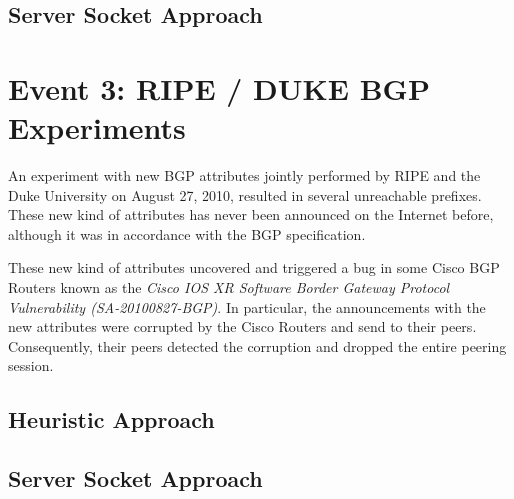 \subsection{Server Socket Approach}

\newpage
\section{Event 3: RIPE / DUKE BGP Experiments}

An experiment with new BGP attributes jointly performed by RIPE and the Duke 
University on August 27, 2010, resulted in several unreachable prefixes\citep{SchatzmannPAM2011}. These 
new kind of attributes has never been announced on the Internet before,  
although it was in accordance with the BGP specification\citep{ripe_duke}.

These new kind of attributes uncovered and triggered a bug in some Cisco BGP 
Routers known as the \emph{Cisco IOS XR Software Border Gateway Protocol Vulnerability (SA-20100827-BGP)}\citep{cisco_vulnerability}. In particular, the announcements with the new attributes were corrupted 
by the Cisco Routers and send to their peers. Consequently, their peers detected 
the corruption and dropped the entire peering session\citep{ripe_duke}.


\subsection{Heuristic Approach}

\subsection{Server Socket Approach}

